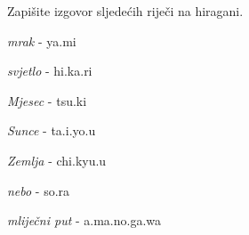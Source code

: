 	\begin{mondai}{Zapišite izgovor sljedećih riječi na hiragani.}
		\item \textit{mrak} - ya.mi
		\item \textit{svjetlo} - hi.ka.ri
		\item \textit{Mjesec} - tsu.ki
		\item \textit{Sunce} - ta.i.yo.u
		\item \textit{Zemlja} - chi.kyu.u
		\item \textit{nebo} - so.ra
		\item \textit{mliječni put} - a.ma.no.ga.wa
	\end{mondai}
